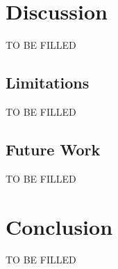 \documentclass[a4paper, sigconf]{acmart}
\begin{document}



\section{Discussion}

TO BE FILLED


\subsection{Limitations}

TO BE FILLED


\subsection{Future Work}

TO BE FILLED

\section{Conclusion}

TO BE FILLED


 

\end{document}
